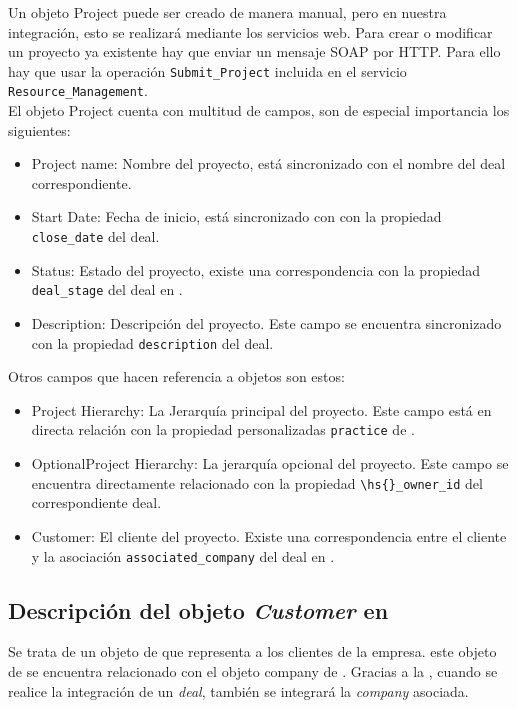 Un objeto Project puede ser creado de manera manual, pero en nuestra integración, esto se realizará mediante los servicios web.
Para crear o modificar un proyecto ya existente hay que enviar un mensaje SOAP por HTTP. 
Para ello hay que usar la operación \texttt{Submit\_Project}  incluida en el servicio \texttt{Resource\_Management}.\\

El objeto Project cuenta con multitud de campos, son de especial importancia los siguientes: 

\begin{itemize}
\item Project name: Nombre del proyecto, está sincronizado con el nombre del deal correspondiente.
\item Start Date: Fecha de inicio, está sincronizado con con la propiedad \texttt{close\_date} del deal.
\item Status: Estado del proyecto, existe una correspondencia con la propiedad \texttt{deal\_stage} del deal en \hs{}.
\item Description: Descripción del proyecto. Este campo se encuentra sincronizado con la propiedad \verb|description| del deal.
\end{itemize}

Otros campos que hacen referencia a objetos son estos: 
\begin{itemize}
\item Project Hierarchy: La Jerarquía principal del proyecto. Este campo está en directa relación con la propiedad personalizadas
\texttt{practice} de \hs.
\item OptionalProject Hierarchy: La jerarquía opcional del proyecto. Este campo se encuentra directamente relacionado con la propiedad \verb|\hs{}_owner_id| del correspondiente deal.
\item Customer: El cliente del proyecto. Existe una correspondencia entre el cliente y la asociación \verb|associated_company| del deal en \hs.

\end{itemize}



\subsection{Descripción del objeto \textit{Customer} en \wday{}}
Se trata de un objeto de \wday{} que representa a los clientes de la empresa. este objeto de \wday{} se encuentra relacionado con el objeto company de \hs. 
Gracias a la \iface{}, cuando se realice la integración de un \textit{deal}, también se integrará la \textit{company} asociada.

